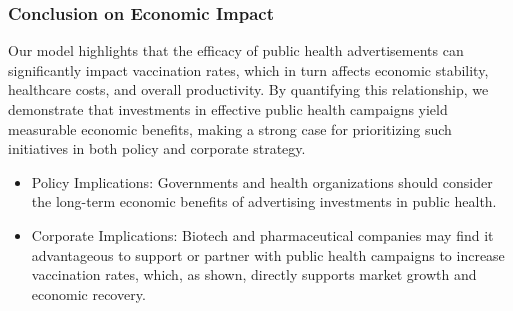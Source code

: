 \documentclass[12pt]{beamer}
\begin{document}
\begin{frame}
\frametitle{Conclusion on Economic Impact}
Our model highlights that the efficacy of public health advertisements can significantly impact vaccination rates, which in turn affects economic stability, healthcare costs, and overall productivity. By quantifying this relationship, we demonstrate that investments in effective public health campaigns yield measurable economic benefits, making a strong case for prioritizing such initiatives in both policy and corporate strategy.

\begin{itemize}
    \item Policy Implications: Governments and health organizations should consider the long-term economic benefits of advertising investments in public health.
    \item Corporate Implications: Biotech and pharmaceutical companies may find it advantageous to support or partner with public health campaigns to increase vaccination rates, which, as shown, directly supports market growth and economic recovery.
\end{itemize}

\end{frame}
\end{document}
